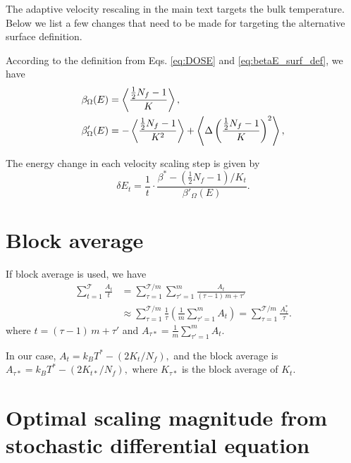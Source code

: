\documentclass[reprint]{revtex4-1}
\begin{document}
The adaptive velocity rescaling in the main text
targets the bulk temperature.
%
Below we list a few changes that need to be made
for targeting the alternative surface definition.

According to the definition from
Eqs. \eqref{eq:DOSE} and \eqref{eq:betaE_surf_def},
we have
\begin{align}
  \beta_\Omega(E)
  &=
  \left\langle
    \frac{ \frac{1}{2}N_f - 1 } { K }
  \right\rangle
  ,
  \notag
  \\
  \beta'_\Omega(E)
  &=
  -
  \left\langle
    \frac{ \frac{1}{2} N_f - 1 } { K^2 }
  \right\rangle
  +
  \left\langle
    \Delta
    \left(
      \frac{ \frac{1}{2} N_f - 1 } { K }
    \right)^2
  \right\rangle
  ,
  \notag
\end{align}

The energy change in each velocity scaling step is given by
\begin{equation}
  \delta E_t
  =
  \frac{1}{t} \cdot
  \frac{ \beta^* - (\frac{1}{2} N_f - 1)/K_t }
  { \beta'_\Omega(E) }
  .
\end{equation}




\section{\label{sec:block}
Block average}

\newcommand{\tmax}{\mathcal T}

If block average is used, we have
%
\begin{align*}
  \sum_{t = 1}^{\tmax} \frac{ A_t } { t }
  &=
  \sum_{\tau = 1}^{\tmax/m}
  \sum_{\tau' = 1}^{m}
  \frac{ A_t } { (\tau - 1) \, m + \tau' }
  \\
  &\approx
  \sum_{\tau = 1}^{\tmax/m}
  \frac{ 1 } { \tau }
  \left(
    \frac 1 m
    \sum_{\tau' = 1}^m
    A_t
  \right)
  =
  \sum_{\tau = 1}^{\tmax/m}
  \frac{ A^*_\tau } { \tau }
  .
\end{align*}
%
where
$t = (\tau - 1) \, m + \tau'$
and
$
A_{\tau*} = \frac 1 m
\sum_{\tau' = 1}^m A_t.
$

In our case,
$
A_t = k_B T^* - \left( 2 K_t / N_f\right),
$
and the block average is
$
A_{\tau*}
= k_B T^* - \left( 2 K_{t*} / N_f\right),
$
where $K_{\tau*}$
is the block average of $K_t$.



\section{\label{sec:error}
  Optimal scaling magnitude
  from stochastic differential equation
}
\end{document}
